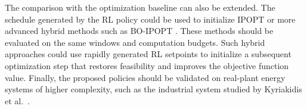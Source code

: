 \documentclass[12pt]{article}
\newcommand{\startnewpage}{\clearpage}
\begin{document}
The comparison with the optimization baseline can also be extended. The schedule generated by the RL policy could be used to initialize IPOPT or more advanced hybrid methods such as BO-IPOPT \cite{kyriakidis2024hybrid}. These methods should be evaluated on the same windows and computation budgets. Such hybrid approaches could use rapidly generated RL setpoints to initialize a subsequent optimization step that restores feasibility and improves the objective function value. Finally, the proposed policies should be validated on real-plant energy systems of higher complexity, such as the industrial system studied by Kyriakidis et al.~\cite{kyriakidis2025energy}.

\startnewpage

\printbibliography
\end{document}
